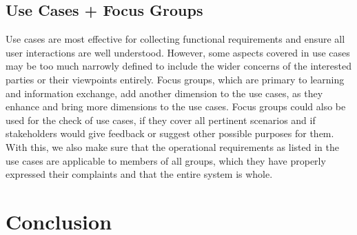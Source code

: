 \documentclass[conference]{IEEEtran}
\begin{document}
\subsection{Use Cases + Focus Groups}
Use cases are most effective for collecting functional requirements and ensure all user interactions are well understood. However, some aspects covered in use cases may be too much narrowly defined to include the wider concerns of the interested parties or their viewpoints entirely. Focus groups, which are primary to learning and information exchange, add another dimension to the use cases, as they enhance and bring more dimensions to the use cases. Focus groups could also be used for the check of use cases, if they cover all pertinent scenarios and if stakeholders would give feedback or suggest other possible purposes for them. With this, we also make sure that the operational requirements as listed in the use cases are applicable to members of all groups, which they have properly expressed their complaints and that the entire system is whole.

\section{Conclusion}
\end{document}
